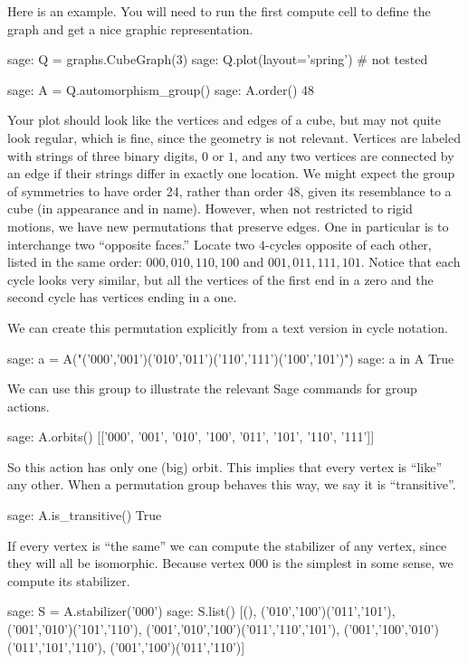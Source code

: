 %
Here is an example.  You will need to run the first compute cell to define the graph and get a nice graphic representation.
%
\begin{sageexample}
sage: Q = graphs.CubeGraph(3)
sage: Q.plot(layout='spring')      # not tested
\end{sageexample}
%
\begin{sageexample}
sage: A = Q.automorphism_group()
sage: A.order()
48
\end{sageexample}
%
Your plot should look like the vertices and edges of a cube, but may not quite look regular, which is fine, since the geometry is not relevant.  Vertices are labeled with strings of three binary digits, $0$ or $1$, and any two vertices are connected by an edge if their strings differ in exactly one location.  We might expect the group of symmetries to have order 24, rather than order 48, given its resemblance to a cube (in appearance and in name).  However, when not restricted to rigid motions, we have new permutations that preserve edges.  One in particular is to interchange two ``opposite faces.''  Locate two $4$-cycles opposite of each other, listed in the same order:  $000, 010, 110, 100$ and $001, 011, 111, 101$.  Notice that each cycle looks very similar, but all the vertices of the first end in a zero and the second cycle has vertices ending in a one.\par
%
We can create this permutation explicitly from a text version in cycle notation.
%
\begin{sageexample}
sage: a = A("('000','001')('010','011')('110','111')('100','101')")
sage: a in A
True
\end{sageexample}
%
We can use this group to illustrate the relevant Sage commands for group actions.
%
\begin{sageexample}
sage: A.orbits()
[['000', '001', '010', '100', '011', '101', '110', '111']]
\end{sageexample}
%
So this action has only one (big) orbit.  This implies that every vertex is ``like'' any other.  When a permutation group behaves this way, we say it is ``transitive''.
%
\begin{sageexample}
sage: A.is_transitive()
True
\end{sageexample}
%
If every vertex is ``the same'' we can compute the stabilizer of any vertex, since they will all be isomorphic.  Because vertex $000$ is the simplest in some sense, we compute its stabilizer.
%
\begin{sageexample}
sage: S = A.stabilizer('000')
sage: S.list()
[(),
 ('010','100')('011','101'),
 ('001','010')('101','110'),
 ('001','010','100')('011','110','101'),
 ('001','100','010')('011','101','110'),
 ('001','100')('011','110')]
\end{sageexample}
